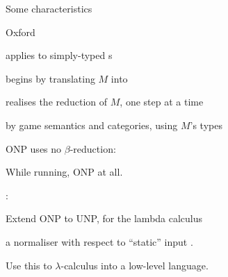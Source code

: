 \documentclass[12pt,fleqn,landscape]{article}
\begin{document}
\begin{slide}{Some characteristics}



Oxford 
\vair

\bi

\item applies to simply-typed {\lexp}s
\vair

\item begins by translating $M$ into 
\vair

\item realises the  reduction of $M$, one step at a time
\vair

\item {}  by game semantics and categories, using $M$'s types
\ei
\vair

\vair\vair

 \hfill ONP uses no  $\beta$-reduction:  
\vair\vair

While running,  ONP    at all.
 
 
\bigskip

: 
\bi

\item Extend ONP to UNP, for the  lambda calculus

\item {} a normaliser with respect to ``static'' input .

Use this to   $\lambda$-calculus into a low-level language.
\ei


\end{slide}



\end{document}
